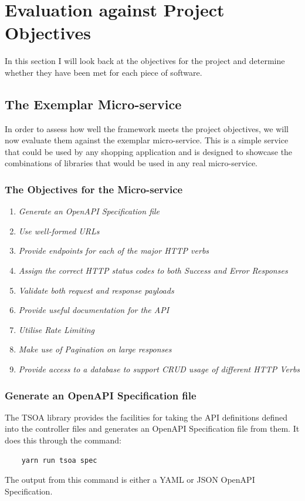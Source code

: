\section{Evaluation against Project Objectives}
In this section I will look back at the objectives for the project and determine whether they have been met for each piece of software.
\subsection{The Exemplar Micro-service}
In order to assess how well the framework meets the project objectives, we will now evaluate them against the exemplar micro-service. This is a simple service that could be used by any shopping application and is designed to showcase the combinations of libraries that would be used in any real micro-service.
\subsubsection{The Objectives for the Micro-service}
\begin{enumerate}
    \item \textit{Generate an OpenAPI Specification file}
    \item \textit{Use well-formed URLs}
    \item \textit{Provide endpoints for each of the major HTTP verbs}
    \item \textit{Assign the correct HTTP status codes to both Success and Error Responses}
    \item \textit{Validate both request and response payloads}
    \item \textit{Provide useful documentation for the API}
    \item \textit{Utilise Rate Limiting}
    \item \textit{Make use of Pagination on large responses}
    \item \textit{Provide access to a database to support CRUD usage of different HTTP Verbs}
\end{enumerate}
\subsubsection{Generate an OpenAPI Specification file}
The TSOA library provides the facilities for taking the API definitions defined into the controller files and generates an OpenAPI Specification file from them. It does this through the command:
\begin{verbatim}
    yarn run tsoa spec
\end{verbatim}
The output from this command is either a YAML or JSON OpenAPI Specification.
